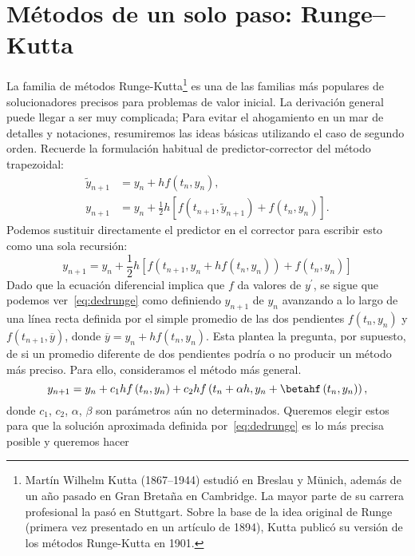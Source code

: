 \section{Métodos de un solo paso: Runge--Kutta}
La familia de métodos Runge-Kutta\footnote{Martín Wilhelm Kutta (1867--1944) estudió en Breslau y Münich, además de un año pasado en Gran Bretaña en Cambridge. La mayor parte de su carrera profesional la pasó en Stuttgart. Sobre la base de la idea original de Runge (primera vez presentado en un artículo de 1894), Kutta publicó su versión de los métodos Runge-Kutta en 1901.} es una de las familias más populares de solucionadores precisos para problemas de valor inicial. La derivación general puede llegar a ser muy complicada; Para evitar el ahogamiento en un mar de detalles y notaciones, resumiremos las ideas básicas utilizando el caso de segundo orden. Recuerde la formulación habitual de predictor-corrector del método trapezoidal:
\begin{align*}
\tilde{y}_{n+1}
&=y_{n}+hf\left(t_{n},y_{n}\right),\\
y_{n+1}
&=y_{n}+\frac{1}{2}h\left[f\left(t_{n+1},\tilde{y}_{n+1}\right)+f\left(t_{n},y_{n}\right)\right].
\end{align*}
Podemos sustituir directamente el predictor en el corrector para escribir esto como una sola recursión:
\begin{equation}\label{eq:dedrunge}
y_{n+1}=
y_{n}+\frac{1}{2}h\left[f\left(t_{n+1},y_{n}+hf\left(t_{n},y_{n}\right)\right)+f\left(t_{n},y_{n}\right)\right]
\end{equation}
Dado que la ecuación diferencial implica que $f$ da valores de $y^{\prime}$, se sigue que podemos ver~\eqref{eq:dedrunge} como definiendo $y_{n+1}$ de $y_{n}$ avanzando a lo largo de una línea recta definida por el simple promedio de las dos pendientes $f\left(t_{n},y_{n}\right)$ y $f\left(t_{n+1},\overline{y}\right)$, donde $\overline{y}=y_{n}+hf\left(t_{n},y_{n}\right)$. Esta plantea la pregunta, por supuesto, de si un promedio diferente de dos pendientes podría o no producir un método más preciso. Para ello, consideramos el método más general.
\begin{equation}\label{eq:casirunge}
y_{n+1}=y_{n}+c_{1}hf\left(t_{n},y_{n}\right)+c_{2}hf\left(t_{n}+\alpha h, y_{n}+\betahf\left(t_{n},y_{n}\right)\right),
\end{equation}
donde $c_{1}$, $c_{2}$, $\alpha$, $\beta$ son parámetros aún no determinados. Queremos elegir estos para que la solución aproximada definida por~\eqref{eq:dedrunge} es lo más precisa posible y queremos hacer
